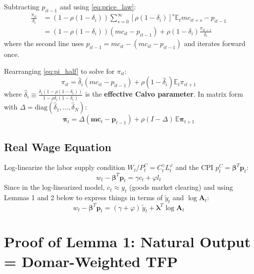 \documentclass[12pt]{article}
\begin{document}
Subtracting $p_{it-1}$ and using \eqref{eq:price_law}:
\begin{align}
    \frac{\pi_{it}}{\delta_i} &= (1-\rho(1-\delta_i))\sum_{s=0}^\infty [\rho(1-\delta_i)]^s \mathbb{E}_t mc_{it+s} - p_{it-1} \nonumber\\
    &= (1-\rho(1-\delta_i))(mc_{it} - p_{it-1}) + \rho(1-\delta_i)\frac{\pi_{it+1}}{\delta_i}
    \label{eq:pi_half}
\end{align}
where the second line uses $p_{it-1} = mc_{it} - (mc_{it}-p_{it-1})$ and iterates forward once.

Rearranging \eqref{eq:pi_half} to solve for $\pi_{it}$:
\begin{equation}
    \pi_{it} = \hat{\delta}_i(mc_{it} - p_{it-1}) + \rho(1-\hat{\delta}_i)\mathbb{E}_t\pi_{it+1}
    \label{eq:pi_sector}
\end{equation}
where $\hat{\delta}_i \equiv \frac{\delta_i(1-\rho(1-\delta_i))}{1-\rho\delta_i(1-\delta_i)}$ is the \textbf{effective Calvo parameter}. In matrix form with $\Delta = \mathrm{diag}(\hat{\delta}_1,\ldots,\hat{\delta}_N)$:
\begin{equation}
    \bm{\pi}_t = \Delta(\bm{mc}_t - \bm{p}_{t-1}) + \rho(I-\Delta)\,\mathbb{E}\bm{\pi}_{t+1}
    \label{eq:pilaw}
\end{equation}

\subsection{Real Wage Equation}

Log-linearize the labor supply condition $W_t/P_t^C = C_t^\gamma L_t^\varphi$ and the CPI $p_t^C = \bm{\beta}^T \bm{p}_t$:
\begin{equation}
    w_t - \bm{\beta}^T\bm{p}_t = \gamma c_t + \varphi l_t
    \label{eq:ls}
\end{equation}
Since in the log-linearized model, $c_t \approx y_t$ (goods market clearing) and using Lemmas 1 and 2 below to express things in terms of $\tilde{y}_t$ and $\log\mathbf{A}_t$:
\begin{equation}
    w_t - \bm{\beta}^T \bm{p}_t = (\gamma+\varphi)\,\tilde{y}_t + \bm{\lambda}^T \log \mathbf{A}_t
    \label{eq:realwage}
\end{equation}

\section{Proof of Lemma 1: Natural Output = Domar-Weighted TFP}
\end{document}
